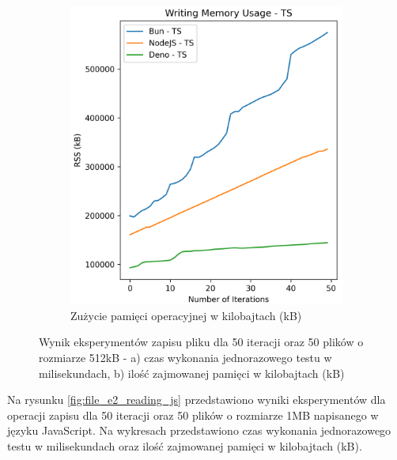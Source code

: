\begin{figure}[H]
  \begin{subfigure}[b]{0.42\textwidth}
    \centering
    \includegraphics[width=\textwidth]{Figures/files/files_writing_50_500_50_ts_memory.png}
    \caption{Zużycie pamięci operacyjnej w kilobajtach (kB)}
    \label{fig:file_e1_writing_ts_memory}
  \end{subfigure}
  \caption{Wynik eksperymentów zapisu pliku dla 50 iteracji oraz 50 plików o rozmiarze 512kB - a) czas wykonania jednorazowego testu w milisekundach, b) ilość zajmowanej pamięci w kilobajtach (kB)}
  \label{fig:file_e1_writing_ts}
\end{figure}

Na rysunku \ref{fig:file_e2_reading_js} przedstawiono wyniki eksperymentów dla operacji zapisu dla 50 iteracji oraz 50 plików o rozmiarze 1MB napisanego w języku JavaScript. Na wykresach przedstawiono czas wykonania jednorazowego testu w milisekundach oraz ilość zajmowanej pamięci w kilobajtach (kB).

